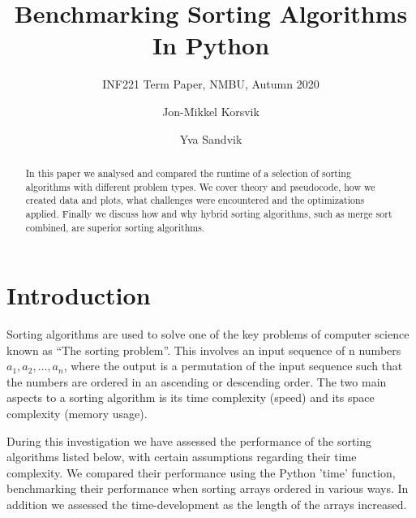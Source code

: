 \documentclass[sigconf, nonacm, natbib, screen, balance=False]{acmart}
\begin{document}
\pagestyle{plain}

\title{Benchmarking Sorting Algorithms In Python}
\subtitle{INF221 Term Paper, NMBU, Autumn 2020}

\author{Jon-Mikkel Korsvik}
\affiliation{}  %

\author{Yva Sandvik}

\begin{abstract}
  In this paper we analysed and compared the runtime of a selection of sorting algorithms with different problem types. We cover theory and pseudocode, how we created data and plots, what challenges were encountered and the optimizations applied. Finally we discuss how and why hybrid sorting algorithms, such as merge sort combined, are superior sorting algorithms. 
\end{abstract}

\maketitle

\section{Introduction}\label{sec:intro}

Sorting algorithms are used to solve one of the key problems of computer science known as “The sorting problem”. This involves an input sequence of n numbers $a_1, a_2, … , a_n$, where the output is a permutation of the input sequence such that the numbers are ordered in an ascending or descending order. The two main aspects to a sorting algorithm is its time complexity (speed) and its space complexity (memory usage).

During this investigation we have assessed the performance of the sorting algorithms listed below, with certain assumptions regarding their time complexity. We compared their performance using the Python 'time' function, benchmarking their performance when sorting arrays ordered in various ways. In addition we assessed the time-development as the length of the arrays increased.  
\end{document}
